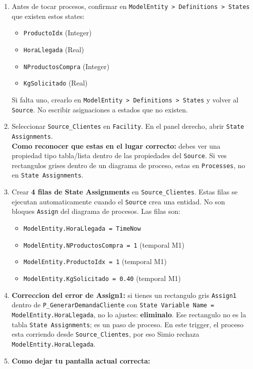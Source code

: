 \documentclass[11pt]{article}
\newcommand{\simio}[1]{\texttt{#1}}
\newcommand{\state}[1]{\texttt{#1}}
\newcommand{\proc}[1]{\texttt{#1}}
\begin{document}
\begin{enumerate}
  \item Antes de tocar procesos, confirmar en \simio{ModelEntity > Definitions > States} que existen estos states:
  \begin{itemize}
    \item \state{ProductoIdx} (Integer)
    \item \state{HoraLlegada} (Real)
    \item \state{NProductosCompra} (Integer)
    \item \state{KgSolicitado} (Real)
  \end{itemize}
  Si falta uno, crearlo en \simio{ModelEntity > Definitions > States} y volver al \simio{Source}. No escribir asignaciones a estados que no existen.
  \item Seleccionar \simio{Source\_Clientes} en \simio{Facility}. En el panel derecho, abrir \simio{State Assignments}.\\
  \textbf{Como reconocer que estas en el lugar correcto:} debes ver una propiedad tipo tabla/lista dentro de las propiedades del \simio{Source}. Si ves rectangulos grises dentro de un diagrama de proceso, estas en \simio{Processes}, no en \simio{State Assignments}.
  \item Crear \textbf{4 filas de State Assignments} en \simio{Source\_Clientes}. Estas filas se ejecutan automaticamente cuando el \simio{Source} crea una entidad. No son bloques \simio{Assign} del diagrama de procesos. Las filas son:
  \begin{itemize}
    \item \state{ModelEntity.HoraLlegada = TimeNow}
    \item \state{ModelEntity.NProductosCompra = 1} (temporal M1)
    \item \state{ModelEntity.ProductoIdx = 1} (temporal M1)
    \item \state{ModelEntity.KgSolicitado = 0.40} (temporal M1)
  \end{itemize}
  \item \textbf{Correccion del error de Assign1:} si tienes un rectangulo gris \simio{Assign1} dentro de \proc{P\_GenerarDemandaCliente} con \state{State Variable Name = ModelEntity.HoraLlegada}, no lo ajustes: \textbf{eliminalo}. Ese rectangulo no es la tabla \simio{State Assignments}; es un paso de proceso. En este trigger, el proceso esta corriendo desde \simio{Source\_Clientes}, por eso Simio rechaza \state{ModelEntity.HoraLlegada}.
  \item \textbf{Como dejar tu pantalla actual correcta:}
  \begin{enumerate}

\end{enumerate}
\end{enumerate}
\end{document}
